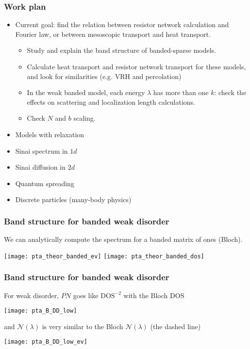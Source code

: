 \documentclass{beamer}
\begin{document}
\begin{frame}\frametitle{Work plan}


\begin{itemize}
    \item Current goal:  find the relation between resistor network calculation and
    Fourier law, or between mesoscopic transport and heat transport.
    \begin{itemize}
        \item  Study and explain the band structure of banded-sparse models.
        \item  Calculate heat transport and resistor network transport 
               for these models, and look for similarities (e.g. VRH and percolation)
        \item  In the weak banded model, each energy $\lambda$ has
               more than one $k$: check the effects on scattering and 
               localization length calculations.
        \item  Check $N$ and $b$ scaling.
    \end{itemize}
    \item  Models with relaxation
    \item  Sinai spectrum in $1d$
    \item  Sinai diffusion in $2d$
    \item  Quantum spreading
    \item  Discrete particles (many-body physics)
\end{itemize}
\end{frame}
\begin{frame}\frametitle{Band structure for banded weak disorder}
We can analytically compute the spectrum for a banded matrix of ones (Bloch).

\texttt{[image: pta\_theor\_banded\_ev]}\newline
\texttt{[image: pta\_theor\_banded\_dos]}

\end{frame}
\begin{frame}\frametitle{Band structure for banded weak disorder}

For weak disorder, $PN$ goes like $\textrm{DOS}^{-2}$ with the Bloch $\textrm{DOS}$

\texttt{[image: pta\_B\_DD\_low]}

and $\mathcal{N}(\lambda)$ is very similar to the Bloch $\mathcal{N}(\lambda)$ (the dashed line)

\texttt{[image: pta\_B\_DD\_low\_ev]}
\end{frame}
\end{document}
